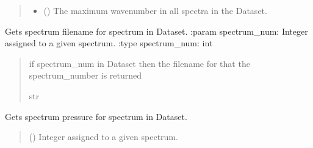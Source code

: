 \documentclass[letterpaper,10pt,english]{sphinxmanual}
\begin{document}
\begin{fulllineitems}
\begin{fulllineitems}
\begin{quote}
\begin{description}
\begin{itemize}
\item {} 
\sphinxAtStartPar
{} () \textendash{} The maximum wavenumber in all spectra in the Dataset.

\end{itemize}


\end{description}\end{quote}

\end{fulllineitems}


\begin{fulllineitems}
\label{\detokenize{MATS:MATS.dataset.Dataset.get_spectrum_filename}}
\pysigstartsignatures
{}
\pysigstopsignatures
\sphinxAtStartPar
Gets spectrum filename for spectrum in Dataset.
:param spectrum\_num: Integer assigned to a given spectrum.
:type spectrum\_num: int
\begin{quote}\begin{description}
\sphinxAtStartPar
{} \textendash{} if spectrum\_num in Dataset then the filename for that the spectrum\_number is returned

\sphinxAtStartPar
str

\end{description}\end{quote}

\end{fulllineitems}


\begin{fulllineitems}
\label{\detokenize{MATS:MATS.dataset.Dataset.get_spectrum_pressure}}
\pysigstartsignatures
{}
\pysigstopsignatures
\sphinxAtStartPar
Gets spectrum pressure for spectrum in Dataset.
\begin{quote}\begin{description}
\sphinxAtStartPar
{} () \textendash{} Integer assigned to a given spectrum.


\end{description}
\end{quote}
\end{fulllineitems}
\end{fulllineitems}
\end{document}
